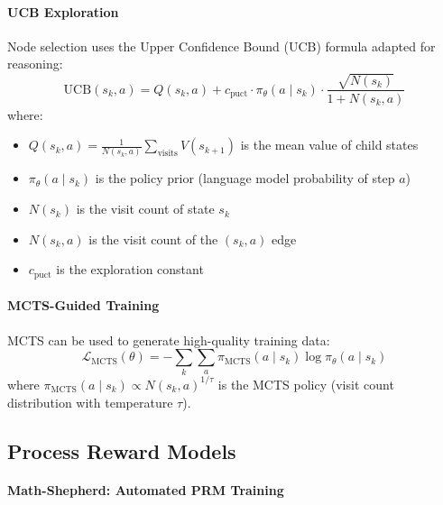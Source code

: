 \paragraph{UCB Exploration}
\label{ucb-exploration}

Node selection uses the Upper Confidence Bound (UCB) formula adapted for reasoning: 
\begin{equation}
    \text{UCB}(s_k, a) = Q(s_k, a) + c_{\text{puct}} \cdot \pi_\theta(a \mid s_k) \cdot \frac{\sqrt{N(s_k)}}{1 + N(s_k, a)}
\end{equation}
 where:

\begin{itemize}
  \item $Q(s_k, a) = \frac{1}{N(s_k,a)} \sum_{\text{visits}} V(s_{k+1})$ is the mean value of child states
  \item $\pi_\theta(a \mid s_k)$ is the policy prior (language model probability of step $a$)
  \item $N(s_k)$ is the visit count of state $s_k$
  \item $N(s_k, a)$ is the visit count of the $(s_k, a)$ edge
  \item $c_{\text{puct}}$ is the exploration constant
\end{itemize}

\paragraph{MCTS-Guided Training}
\label{mcts-guided-training}

MCTS can be used to generate high-quality training data: 
\begin{equation}
    \mathcal{L}_{\text{MCTS}}(\theta) = -\sum_{k} \sum_{a} \pi_{\text{MCTS}}(a \mid s_k) \log \pi_\theta(a \mid s_k)
\end{equation}
 where $\pi_{\text{MCTS}}(a \mid s_k) \propto N(s_k, a)^{1/\tau}$ is the MCTS policy (visit count distribution with temperature $\tau$).

\subsection{Process Reward Models}
\label{subsubsec:prm_methods}

\paragraph{Math-Shepherd: Automated PRM Training}
\label{math-shepherd-automated-prm-training}

